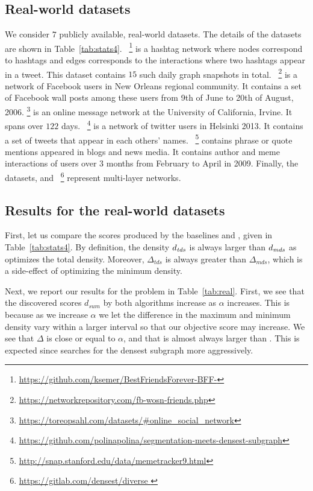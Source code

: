 \subsection{Real-world datasets} %
We consider $7$ publicly available, real-world datasets. The details of the datasets are shown in Table~\ref{tab:stats4}.
~\cite{tsantarliotis2015topic}\footnote{\url{https://github.com/ksemer/BestFriendsForever-BFF-}\label{foot:gitbff}}  is a hashtag network where nodes correspond to hashtags and edges corresponds to the
interactions where two hashtags appear in a tweet. This dataset contains $15$ such daily graph snapshots in total. 
~\cite{viswanath2009evolution}\footnote{\url{https://networkrepository.com/fb-wosn-friends.php} } is a network of Facebook users in  New Orleans regional
community.  It contains a set of Facebook wall posts among these users from 9th of June to 20th of August, 2006.
\footnote{\url{https://toreopsahl.com/datasets/\#online_social_network}} is an online message
network at the University of California, Irvine. It spans over $122$ days.
~\cite{rozenshtein2020finding}\footnote{\url{https://github.com/polinapolina/segmentation-meets-densest-subgraph}} is a network of twitter users in Helsinki 2013.
It contains a set of tweets that appear in each others' names.
 ~\cite{leskovec2009meme}\footnote{\url{http://snap.stanford.edu/data/memetracker9.html}} contains 
phrase or quote mentions appeared in blogs and news media.  It contains author and meme interactions of users over $3$ months from February to April in 2009. Finally, the datasets,  and ~\cite{oettershagen2024finding}\footnote{\url{https://gitlab.com/densest/diverse } \label{foot:diverse-repo}} represent multi-layer networks.

\subsection{Results for the real-world datasets}
First, let us compare the scores produced by the baselines \problemdts and \problemdcs, given in Table~\ref{tab:stats4}. By definition, the density $d_{\mathit{tds}}$ is always larger than $d_{\mathit{mds}}$ as \problemdts optimizes the total density. Moreover, $\Delta_{\mathit{tds}}$ is always greater than $\Delta_{\mathit{mds}}$, which is a side-effect of \problemdcs optimizing the minimum density.

Next, we report our results for the \problemcdcsm problem in Table~\ref{tab:real}. 
First, we see that the discovered scores $d_{\mathit{sum}}$ by both algorithms increase as $\alpha$ increases. This is because as we increase $\alpha$ we let the difference in the maximum and minimum density vary within a larger interval so that our objective score may increase. We see that $\Delta$ is close or equal to $\alpha$, and that \algipcm is almost always larger than \alggrdfms. This is expected since \algipcm searches for the densest subgraph more aggressively.

